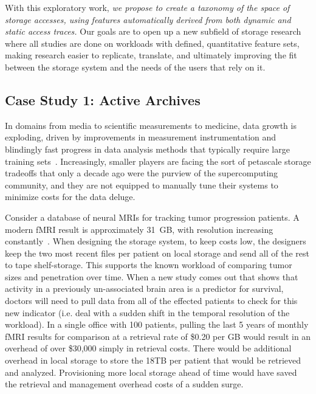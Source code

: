 With this exploratory work, \textit{we propose to create a taxonomy of the space of storage accesses, using features automatically derived from both
dynamic and static access traces.}
Our goals are to open up a new subfield of storage research where all studies
are done on workloads with defined, quantitative feature sets, making research
easier to replicate, translate, and ultimately improving the fit between the
storage system and the needs of the users that rely on it.%

\subsection{Case Study 1: Active Archives}
In domains from media to scientific measurements to medicine, data growth is exploding, driven by
improvements in measurement instrumentation and blindingly fast progress in data
analysis methods that typically require large training sets~\cite{raghupathi2014big,gantz2012digital,chen2014big}.
Increasingly, smaller players are facing the sort of petascale storage tradeoffs
that only a decade ago were the purview of the supercomputing community, and
they are not equipped to manually tune their systems to minimize costs for the
data deluge.  

Consider a
database of neural MRIs for tracking tumor progression patients.  A modern fMRI
result is approximately 31~GB, with resolution increasing
constantly~\cite{hanke2014high}. When designing the storage system,
to keep costs low, the designers keep the two most recent files per patient on local
storage and send all of the rest to tape shelf-storage.  This supports the known
workload of comparing tumor sizes and penetration over time.  When a new study
comes out that shows that activity in a previously un-associated brain area is a
predictor for survival, doctors will need to pull data from all of the effected
patients to check for this new indicator (i.e. deal with a sudden shift in the
temporal resolution of the workload).  In a single office with 100 patients,
pulling the last 5 years of monthly fMRI results for comparison at a retrieval
rate of \$0.20 per GB would result in an overhead of over \$30,000 simply in
retrieval costs.  There would be additional overhead in local storage to store
the 18TB per patient that would be retrieved and analyzed.  Provisioning more
local storage ahead of time would have saved the retrieval and management
overhead costs of a sudden surge.    

